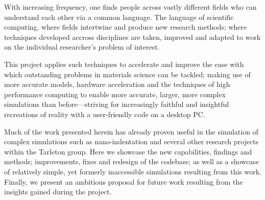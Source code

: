 With increasing frequency, one finds people across vastly different fields who can understand each other via a common language. The language of scientific computing, where fields intertwine and produce new research methods; where techniques developed accross disciplines are taken, improved and adapted to work on the individual researcher's problem of interest.

This project applies such techniques to accelerate and improve the ease with which outstanding problems in materials science can be tackled; making use of more accurate models, hardware acceleration and the techniques of high performance computing to enable more accurate, larger, more complex simulations than before---striving for increasingly faithful and insightful recreations of reality with a user-friendly code on a desktop PC.

Much of the work presented herein has already proven useful in the simulation of complex simulations such as nano-indentation \cite{YU2018} and several other research projects within the Tarleton group. Here we showcase the new capabilities, findings and methods; improvements, fixes and redesign of the codebase; as well as a showcase of relatively simple, yet formerly inaccessible simulations resulting from this work. Finally, we present an ambitious proposal for future work resulting from the insights gained during the project.
\savearabiccounter

